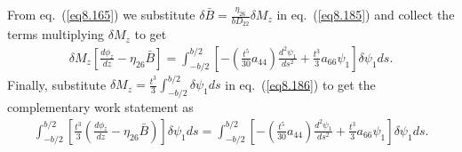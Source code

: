 \documentclass{AeroStructure-ERJohnson}
\begin{document}
From eq.~(\ref{eq8.165}) we substitute $\delta
\bar{B}=\frac{\eta_{26}}{b D_{22}} \delta M_{z}$ in
eq.~(\ref{eq8.185}) and collect the terms multiplying $\delta
M_{z}$ to get
\begin{align}\label{eq8.186}
\delta M_{z}\left[\frac{d \phi_{z}}{d z}-\eta_{26}
\bar{B}\right]=\int_{-b/ 2}^{b/ 2}\left[-\left(\frac{t^{5}}{30}
a_{44}\right) \frac{d^{2} \psi_{1}}{d s^{2}}+\frac{t^{3}}{3}
a_{66} \psi_{1}\right] \delta \psi_{1} d s.
\end{align}
Finally, substitute $\delta M_{z}=\frac{t^{3}}{3} \int_{-b/ 2}^{b/ 2} \delta \psi_{1} d s$ in eq.~(\ref{eq8.186}) to get the
complementary work statement as
\begin{align}\label{eq8.187}
\int_{-b/ 2}^{b/ 2}\left[\frac{t^{3}}{3}\left(\frac{d
\phi_{z}}{d z}-\eta_{26} \bar{B}\right)\right] \delta \psi_{1} d
s=\int_{-b/ 2}^{b/ 2}\left[-\left(\frac{t^{5}}{30} a_{44}\right)
\frac{d^{2} \psi_{1}}{d s^{2}}+\frac{t^{3}}{3} a_{66}
\psi_{1}\right] \delta \psi_{1} d s.
\end{align}

\vspace*{-1pc}
\end{document}
